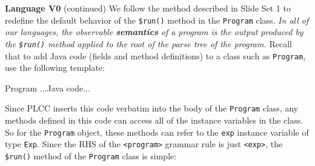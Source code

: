 \begin{minipage}[t]{\sw}
\slidenumber
\LARGE
{\bf Language V0} (continued)\exx
We follow the method described in Slide Set 1
to redefine the default behavior of the \verb'$run()' method
in the \verb'Program' class.
{\em In all of our languages,
the observable {\bf semantics} of a program
is the output produced by the \verb'$run()' method
applied to the root of the parse tree of the program.}\exx
Recall that to add Java code (fields and method definitions)
to a class such as \verb'Program',
use the following template:
\Large
\begin{qv}
Program
...Java code...
\end{qv}
\LARGE
Since PLCC inserts this code verbatim
into the body of the \verb'Program' class,
any methods defined in this code
can access all of the instance variables in the class.
So for the \verb'Program' object,
these methods can refer to the \verb'exp' instance variable
of type \verb'Exp'.
Since the RHS of the \verb'<program>' grammar rule is just \verb'<exp>',
the \verb'$run()' method of the \verb'Program' class is simple:
{\Large
{}
}
\end{minipage}
\clearpage
